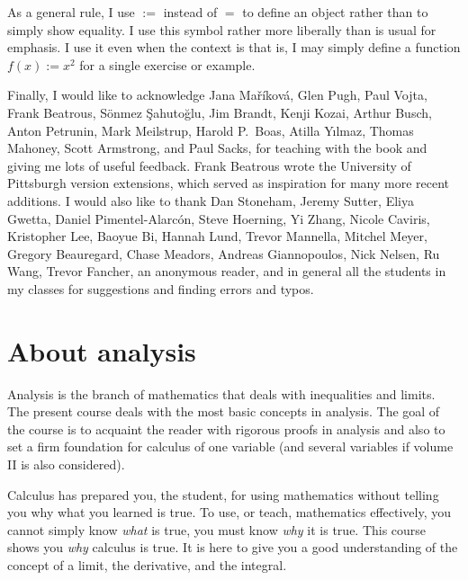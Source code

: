 As a general rule, I use $:=$ instead of $=$ to define an
object rather than to simply show equality.  I use this symbol rather more
liberally than is usual for emphasis.
I use it even when the context is 
that is, I may simply define a function $f(x) := x^2$
for a single exercise or example.

\medskip

Finally, I would like to acknowledge Jana Ma\v{r}\'ikov\'a,
Glen Pugh, Paul Vojta, Frank Beatrous, S\"{o}nmez \c{S}ahuto\u{g}lu,
Jim Brandt, Kenji Kozai, Arthur Busch,  Anton Petrunin,
Mark Meilstrup, Harold P.\ Boas, Atilla Y{\i}lmaz,
Thomas Mahoney, Scott Armstrong, and Paul Sacks,
for teaching with the book and giving me lots of useful feedback.
Frank Beatrous wrote the University of Pittsburgh version extensions, which
served as inspiration for many more recent additions.
I would also like to thank
Dan Stoneham, Jeremy Sutter, Eliya Gwetta, Daniel Pimentel-Alarc\'on,
Steve Hoerning, Yi Zhang, Nicole Caviris,
Kristopher Lee, Baoyue Bi, Hannah Lund,
Trevor Mannella, Mitchel Meyer, Gregory Beauregard,
Chase Meadors, Andreas Giannopoulos, Nick Nelsen,
Ru Wang, Trevor Fancher,
an anonymous reader, and in general all the students in my classes for suggestions and
finding errors and typos.

\VolTwoIntro


\sectionnewpage
\section{About analysis} \label{sec:aboutra}

Analysis is the branch of mathematics that deals with inequalities and
limits.  The present course deals with the most basic 
concepts in analysis.  The goal of the course is to acquaint the reader
with rigorous proofs in analysis and also to
set a firm foundation for calculus of one variable (and several variables if
volume II is also considered).

Calculus has prepared you, the student, for using mathematics without telling
you why what you learned is true.  To use, or teach, mathematics
effectively, you cannot simply know \emph{what} is true, you must know
\emph{why} it is true.  This course shows you \emph{why} calculus
is true.  It is here to give you a good understanding of the concept of a
limit, the derivative, and the integral.

